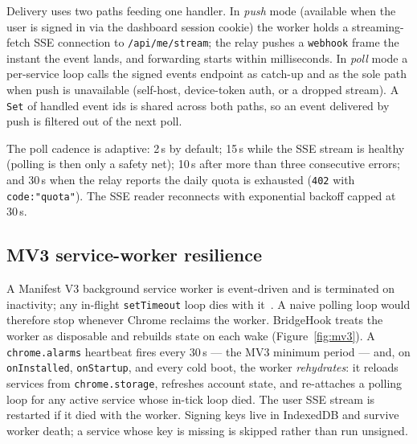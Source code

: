 \documentclass[11pt]{article}
\begin{document}
Delivery uses two paths feeding one handler. In \emph{push} mode (available
when the user is signed in via the dashboard session cookie) the worker holds a
streaming-fetch SSE connection to \texttt{/api/me/stream}; the relay pushes a
\texttt{webhook} frame the instant the event lands, and forwarding starts within
milliseconds. In \emph{poll} mode a per-service loop calls the signed events
endpoint as catch-up and as the sole path when push is unavailable (self-host,
device-token auth, or a dropped stream). A \texttt{Set} of handled event ids is
shared across both paths, so an event delivered by push is filtered out of the
next poll.

The poll cadence is adaptive: 2\,s by default; 15\,s while the SSE stream is
healthy (polling is then only a safety net); 10\,s after more than three
consecutive errors; and 30\,s when the relay reports the daily quota is
exhausted (\texttt{402} with \texttt{code:"quota"}). The SSE reader reconnects
with exponential backoff capped at 30\,s.

\subsection{MV3 service-worker resilience}
\label{sec:mv3}

A Manifest V3 background service worker is event-driven and is terminated on
inactivity; any in-flight \texttt{setTimeout} loop dies with
it~\cite{mv3swlifecycle}. A naive polling loop would therefore stop whenever
Chrome reclaims the worker. BridgeHook treats the worker as disposable and
rebuilds state on each wake (Figure~\ref{fig:mv3}). A \texttt{chrome.alarms}
heartbeat fires every 30\,s --- the MV3 minimum period --- and, on
\texttt{onInstalled}, \texttt{onStartup}, and every cold boot, the worker
\emph{rehydrates}: it reloads services from \texttt{chrome.storage}, refreshes
account state, and re-attaches a polling loop for any active service whose
in-tick loop died. The user SSE stream is restarted if it died with the worker.
Signing keys live in IndexedDB and survive worker death; a service whose key is
missing is skipped rather than run unsigned.
\end{document}

